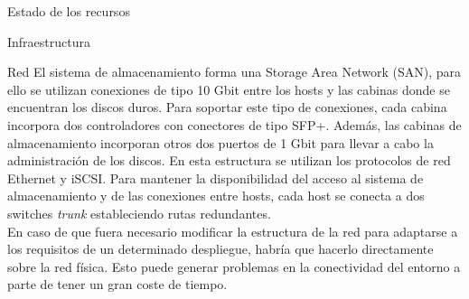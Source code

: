 \begin{chapter}{Estado de los recursos}
\begin{section}{Infraestructura}
\begin{subsection}{Red}
    El sistema de almacenamiento forma una Storage Area Network (SAN), para ello se utilizan conexiones de tipo 10 Gbit entre los hosts y las cabinas donde se encuentran los discos duros. Para soportar este tipo de conexiones, cada cabina incorpora dos controladores con conectores de tipo SFP+. Además, las cabinas de almacenamiento incorporan otros dos puertos de 1 Gbit para llevar a cabo la administración de los discos. En esta estructura se utilizan los protocolos de red Ethernet y iSCSI. Para mantener la disponibilidad del acceso al sistema de almacenamiento y de las conexiones entre hosts, cada host se conecta a dos switches \textit{trunk} estableciendo rutas redundantes.\\
    En caso de que fuera necesario modificar la estructura de la red para adaptarse a los requisitos de un determinado despliegue, habría que hacerlo directamente sobre la red física. Esto puede generar problemas en la conectividad del entorno a parte de tener un gran coste de tiempo.
\end{subsection}

\end{section}


\end{chapter}
